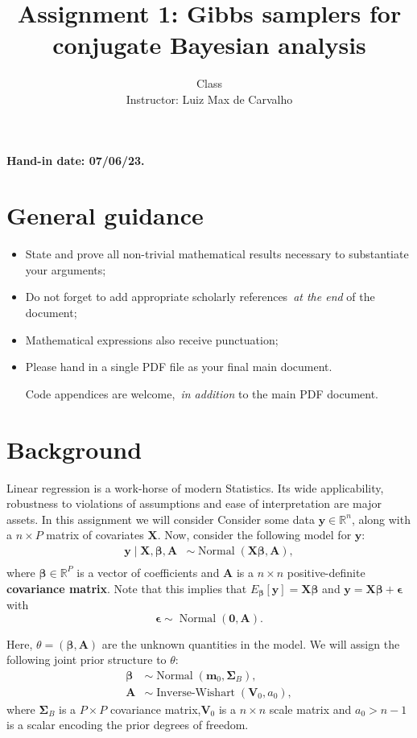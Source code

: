 \documentclass[a4paper,10pt, notitlepage]{report}
\title{Assignment 1: Gibbs samplers for conjugate Bayesian analysis}
\author{Class \\ Instructor: Luiz Max de Carvalho}
\newcommand{\bX}{ \boldsymbol{X}} %
\newcommand{\by}{ \boldsymbol{y} } %
\newcommand{\bb}{ \boldsymbol{\beta} }
\newcommand{\ba}{ \boldsymbol{A} }
\begin{document}
\maketitle

\textbf{Hand-in date: 07/06/23.}

\section*{General guidance}
\begin{itemize}
 \item State and prove all non-trivial mathematical results necessary to substantiate your arguments;
 \item Do not forget to add appropriate scholarly references~\textit{at the end} of the document;
 \item Mathematical expressions also receive punctuation;
 \item Please hand in a single PDF file as your final main document.
 
 Code appendices are welcome,~\textit{in addition} to the main PDF document.
 \end{itemize}

\newpage

\section*{Background}
Linear regression is a work-horse of modern Statistics.
Its wide applicability, robustness to violations of assumptions and ease of interpretation are major assets. 
In this assignment we will consider 
Consider some data $\by \in \mathbb{R}^n$, along with a $n \times P$ matrix of covariates $\boldsymbol{X}$.
Now, consider the following model for $\boldsymbol{y}$:
\begin{align*}
    \by \mid \bX, \bb, \ba & \sim \operatorname{Normal}\left(\bX \bb, \ba\right),\\
\end{align*}
where $\bb \in \mathbb{R}^P$ is a vector of coefficients and  $\ba$ is a $n \times n$ positive-definite \textbf{covariance matrix}.
Note that this implies that $E_{\boldsymbol{\beta}}[\by] = \bX\bb$ and $\by = \bX\bb + \boldsymbol{\epsilon}$ with
\begin{equation*}
    \boldsymbol{\epsilon} \sim \operatorname{Normal}(\boldsymbol{0}, \ba).
\end{equation*}

Here, $\theta = (\bb, \ba)$ are the unknown quantities in the model.
We will assign the following joint prior structure to $\theta$:
\begin{align*}
        \bb & \sim \operatorname{Normal}\left(\boldsymbol{m}_0, \boldsymbol{\Sigma}_B\right),\\
    \ba &\sim \operatorname{Inverse-Wishart}(\boldsymbol{V}_0, a_0),
\end{align*}
where  $\boldsymbol{\Sigma}_B$ is a $P \times P$ covariance matrix,$\boldsymbol{V}_0$ is a $n \times n$ scale matrix and $a_0 >  n - 1$ is a scalar encoding the prior degrees of freedom.
\end{document}
